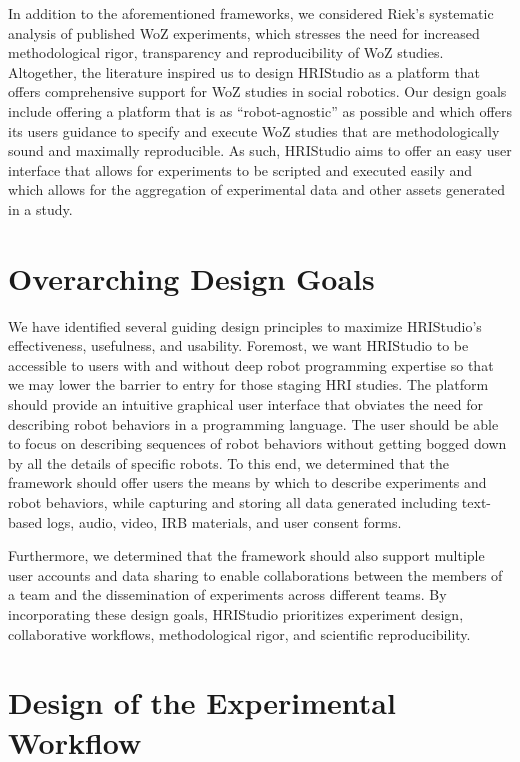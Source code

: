 \documentclass[letterpaper, 10 pt, conference]{ieeeconf}
\begin{document}
In addition to the aforementioned frameworks, we considered Riek's systematic analysis of published WoZ experiments, which stresses the need for increased methodological rigor, transparency and reproducibility of WoZ studies.~\cite{Riek2012} Altogether, the literature inspired us to design HRIStudio as a platform that offers comprehensive support for WoZ studies in social robotics. Our design goals include offering a platform that is as ``robot-agnostic'' as possible and which offers its users guidance to specify and execute WoZ studies that are methodologically sound and maximally reproducible. As such, HRIStudio aims to offer an easy user interface that allows for experiments to be scripted and executed easily and which allows for the aggregation of experimental data and other assets generated in a study.

\section{Overarching Design Goals}

We have identified several guiding design principles to maximize HRIStudio's effectiveness, usefulness, and usability. Foremost, we want HRIStudio to be accessible to users with and without deep robot programming expertise so that we may lower the barrier to entry for those staging HRI studies. The platform should provide an intuitive graphical user interface that obviates the need for describing robot behaviors in a programming language. The user should be able to focus on describing sequences of robot behaviors without getting bogged down by all the details of specific robots. To this end, we determined that the framework should offer users the means by which to describe experiments and robot behaviors, while capturing and storing all data generated including text-based logs, audio, video, IRB materials, and user consent forms. 

Furthermore, we determined that the framework should also support multiple user accounts and data sharing to enable collaborations between the members of a team and the dissemination of experiments across different teams. By incorporating these design goals, HRIStudio prioritizes experiment design, collaborative workflows, methodological rigor, and scientific reproducibility.

\section{Design of the Experimental Workflow}
\end{document}

